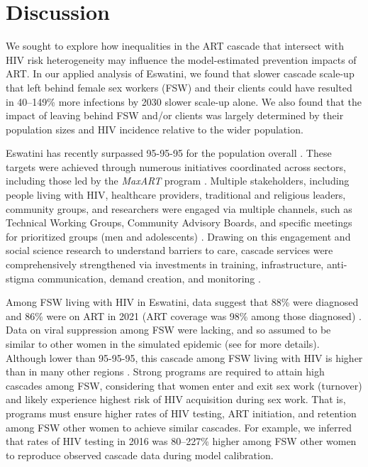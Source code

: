 \section{Discussion}\label{art.disc}
We sought to explore how inequalities in the ART cascade
that intersect with HIV risk heterogeneity
may influence the model-estimated prevention impacts of ART.
In our applied analysis of Eswatini, we found that
slower cascade scale-up that left behind female sex workers (FSW) and their clients
could have resulted in 40--149\% more infections by 2030 \vs slower scale-up alone. %
We also found that the impact of
leaving behind FSW and/or clients was largely determined by
their population sizes and HIV incidence relative to the wider population.
\par
Eswatini has recently surpassed 95-95-95 for the population overall \cite{SHIMS3}.
These targets were achieved through
numerous initiatives coordinated across sectors,
including those led by the \emph{MaxART} program \cite{MaxART1,MaxART2}.
Multiple stakeholders, including people living with HIV, healthcare providers,
traditional and religious leaders, community groups, and researchers
were engaged via multiple channels, such as
Technical Working Groups, Community Advisory Boards,
and specific meetings for prioritized groups (men and adolescents) \cite{MaxART1,MaxART2}.
Drawing on this engagement and
social science research to understand barriers to care,
cascade services were comprehensively strengthened via investments in
training, infrastructure, anti-stigma communication, demand creation, and monitoring
\cite{MaxART1,MaxART2}.
\par
Among FSW living with HIV in Eswatini, data suggest that
88\% were diagnosed and 86\% were on ART in 2021
(\ie ART coverage was 98\% among those diagnosed) \cite{EswIBBS2022}.
Data on viral suppression among FSW were lacking,
and so assumed to be similar to other women in the simulated epidemic
(see  for more details).
Although lower than 95-95-95, this cascade among FSW living with HIV
is higher than in many other regions \cite{Schwartz2017,Hakim2018}.
Strong programs are required to attain high cascades among FSW,
considering that women enter and exit sex work (turnover) and
likely experience highest risk of HIV acquisition during sex work.
That is, programs must ensure higher rates of HIV testing, ART initiation, and retention
among FSW \vs other women to achieve similar cascades.
For example, we inferred that rates of HIV testing in 2016 was 80--227\% higher
among FSW \vs other women to reproduce observed cascade data during model calibration.
